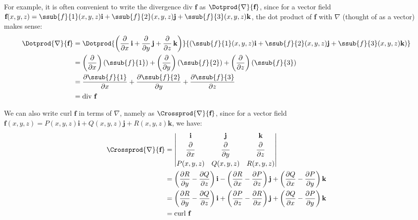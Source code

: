 For example, it is often convenient to write the divergence $\text{div }\textbf{f}$ as $\Dotprod{\nabla}{\textbf{f}}$, since for a vector field $\textbf{f}(x,y,z) = \ssub{f}{1}(x,y,z)\textbf{i} + \ssub{f}{2}(x,y,z) \textbf{j} + \ssub{f}{3}(x,y,z) \textbf{k}$, the dot product of \textbf{f} with $\nabla$ (thought of as a vector) makes sense:
\begin{align*}
 \Dotprod{\nabla}{\textbf{f}} &= \Dotprod{ \left( \frac{\partial}{\partial x}\,\textbf{i} +
  \frac{\partial}{\partial y}\,\textbf{j} + \frac{\partial}{\partial z}\,\textbf{k} \right) }{\left( \ssub{f}{1}(x,y,z)
  \textbf{i} + \ssub{f}{2}(x,y,z) \textbf{j} + \ssub{f}{3}(x,y,z) \textbf{k} \right) }\\
   &= \left( \frac{\partial}{\partial x} \right) (\ssub{f}{1}) +
    \left( \frac{\partial}{\partial y} \right) (\ssub{f}{2}) +
    \left( \frac{\partial}{\partial z} \right) (\ssub{f}{3})\\
   &= \frac{\partial \ssub{f}{1}}{\partial x} + \frac{\partial \ssub{f}{2}}{\partial y} +
  \frac{\partial \ssub{f}{3}}{\partial z}\\
   &= \text{div }\textbf{f}
\end{align*}

We can also write $\text{curl }\textbf{f}$ in terms of $\nabla$, namely as $\Crossprod{\nabla}{\textbf{f}}$, since for a vector field $\textbf{f}(x,y,z) = P(x,y,z)\textbf{i} + Q(x,y,z)\textbf{j} + R(x,y,z)\textbf{k}$, we have:
\begin{align*}
 \Crossprod{\nabla}{\textbf{f}} &=
 \begin{vmatrix}
  \textbf{i} & \textbf{j} & \textbf{k} \vspace{1mm}\\ \dfrac{\partial}{\partial x} & \dfrac{\partial}{\partial y} &
   \dfrac{\partial}{\partial z} \vspace{1mm}\\
  P(x,y,z) & Q(x,y,z) & R(x,y,z)
 \end{vmatrix}\\
 &= \left( \frac{\partial R}{\partial y} - \frac{\partial Q}{\partial z} \right) \textbf{i} -
    \left( \frac{\partial R}{\partial x} - \frac{\partial P}{\partial z} \right) \textbf{j} +
    \left( \frac{\partial Q}{\partial x} - \frac{\partial P}{\partial y} \right) \textbf{k}\\
 &= \left( \frac{\partial R}{\partial y} - \frac{\partial Q}{\partial z} \right) \textbf{i} +
    \left( \frac{\partial P}{\partial z} - \frac{\partial R}{\partial x} \right) \textbf{j} +
    \left( \frac{\partial Q}{\partial x} - \frac{\partial P}{\partial y} \right) \textbf{k}\\
 &= \text{curl }\textbf{f}
\end{align*}

